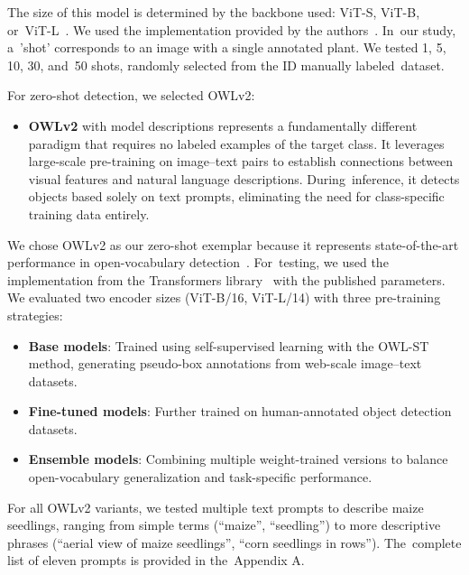 \documentclass[12pt,a4paper,oneside]{report}
\begin{document}
The size of this model is determined by the backbone used: ViT-S, ViT-B, or~ViT-L~\cite{oquabDINOv2LearningRobust2024}. We used the implementation provided by the 
authors~\cite{fuCrossDomainFewShotObject2024}. In~our study, a~'shot' corresponds 
to an image with a single annotated plant. We tested 1, 5, 10, 30, and~50 shots, 
randomly selected from the ID manually labeled~dataset.

For zero-shot detection, we selected OWLv2:

\begin{itemize}
  \item \textbf{OWLv2} %
  with model descriptions represents a fundamentally different paradigm that requires 
  no labeled examples of the target class. It leverages large-scale pre-training on 
  image--text pairs to establish connections between visual features and natural 
  language descriptions. During~inference, it detects objects based solely on 
  text prompts, eliminating the need for class-specific training data entirely.
\end{itemize}

We chose OWLv2 as our zero-shot exemplar because it represents state-of-the-art 
performance in open-vocabulary detection~\cite{mindererScalingOpenVocabularyObject2023,
liuGroundingDINOMarrying2025}. For~testing, we used the implementation from the 
Transformers library~\cite{wolfTransformersStateoftheArtNatural2020} with 
the published parameters. We evaluated two encoder sizes (ViT-B/16, ViT-L/14) 
with three pre-training strategies:

\begin{itemize}
    \item \textbf{Base models}: %
Trained using self-supervised learning with the 
    OWL-ST method, generating pseudo-box annotations from web-scale image--text 
    datasets.
    \item \textbf{Fine-tuned models}: %
Further trained on human-annotated object 
    detection datasets.
    \item \textbf{Ensemble models}: %
Combining multiple weight-trained versions to 
    balance open-vocabulary generalization and task-specific performance.
\end{itemize}

For all OWLv2 variants, we tested multiple text prompts to describe maize seedlings, 
ranging from simple terms (``maize'', ``seedling'') to more descriptive phrases 
(``aerial view of maize seedlings'', ``corn seedlings in rows''). The~complete list 
of eleven prompts is provided in the~Appendix A.
\end{document}
